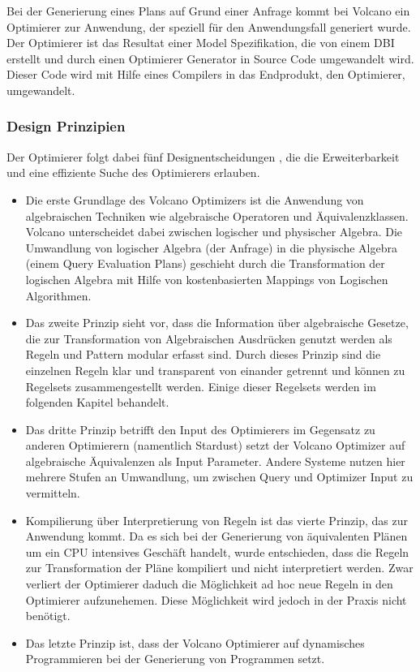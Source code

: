 Bei der Generierung eines Plans auf Grund einer Anfrage kommt bei Volcano ein Optimierer zur Anwendung, der speziell für den Anwendungsfall generiert wurde. Der Optimierer ist das Resultat einer Model Spezifikation, die von einem \ac{DBI} erstellt und durch einen Optimierer Generator in Source Code umgewandelt wird. Dieser Code wird mit Hilfe eines Compilers in das Endprodukt, den Optimierer, umgewandelt.

 \subsubsection{Design Prinzipien}

Der Optimierer folgt dabei fünf Designentscheidungen \cite{graefe1993volcano}, die die Erweiterbarkeit und eine effiziente Suche des Optimierers erlauben.

\begin{itemize}

\item Die erste Grundlage des Volcano Optimizers ist die Anwendung von algebraischen Techniken wie algebraische Operatoren und Äquivalenzklassen. Volcano unterscheidet dabei zwischen logischer und physischer Algebra. Die Umwandlung von logischer Algebra (der Anfrage) in die physische Algebra (einem Query Evaluation Plans) geschieht durch die Transformation der logischen Algebra mit Hilfe von kostenbasierten Mappings von Logischen Algorithmen.


\item Das zweite Prinzip sieht vor, dass die Information über algebraische Gesetze, die zur Transformation von Algebraischen Ausdrücken genutzt werden als Regeln und Pattern modular erfasst sind. Durch dieses Prinzip sind die einzelnen Regeln klar und transparent von einander getrennt und können zu Regelsets zusammengestellt werden. Einige dieser Regelsets werden im folgenden Kapitel behandelt.


\item Das dritte Prinzip betrifft den Input des Optimierers im Gegensatz zu anderen Optimierern (namentlich Stardust) setzt der Volcano Optimizer auf algebraische Äquivalenzen als Input Parameter. Andere Systeme nutzen hier mehrere Stufen an Umwandlung, um zwischen Query und Optimizer Input zu vermitteln. 

\item Kompilierung über Interpretierung von Regeln ist das vierte Prinzip, das zur Anwendung kommt. Da es sich bei der Generierung von äquivalenten Plänen um ein CPU intensives Geschäft handelt, wurde entschieden, dass die Regeln zur Transformation der Pläne kompiliert und nicht interpretiert werden. Zwar verliert der Optimierer daduch die Möglichkeit ad hoc neue Regeln in den Optimierer aufzunehemen. Diese Möglichkeit wird jedoch in der Praxis nicht benötigt.

\item Das letzte Prinzip ist, dass der Volcano Optimierer auf dynamisches Programmieren bei der Generierung von Programmen setzt. 


\end{itemize}





